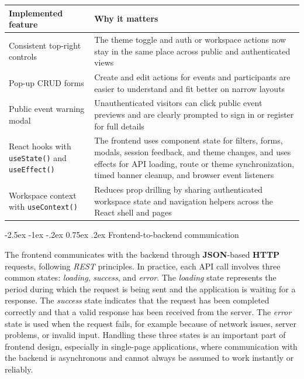 \documentclass[11pt,a4paper]{article}
\makeatletter
\renewcommand\subsection{\@startsection{subsection}{2}{\z@}%
  {-2.5ex \@plus -1ex \@minus -.2ex}%
  {0.75ex \@plus .2ex}%
  {\normalfont\large\sffamily\bfseries\color{MidnightBlue}}}
\makeatother
\begin{document}
\begin{center}
\begin{tabularx}{\textwidth}{@{}lY@{}}
\toprule
\textbf{Implemented feature} & \textbf{Why it matters} \\
\midrule
Consistent top-right controls & The theme toggle and auth or workspace actions now stay in the same place across public and authenticated views \\
Pop-up CRUD forms & Create and edit actions for events and participants are easier to understand and fit better on narrow layouts \\
Public event warning modal & Unauthenticated visitors can click public event previews and are clearly prompted to sign in or register for full details \\
React hooks with \texttt{useState()} and \texttt{useEffect()} & The frontend uses component state for filters, forms, modals, session feedback, and theme changes, and uses effects for API loading, route or theme synchronization, timed banner cleanup, and browser event listeners \\
Workspace context with \texttt{useContext()} & Reduces prop drilling by sharing authenticated workspace state and navigation helpers across the React shell and pages \\
\bottomrule
\end{tabularx}
\end{center}

\subsection{Frontend-to-backend communication}

The frontend communicates with the backend through \textbf{JSON}-based \textbf{HTTP} requests, following \textit{REST} principles. In practice, each API call involves three common states: \textit{loading}, \textit{success}, and \textit{error}. The \textit{loading} state represents the period during which the request is being sent and the application is waiting for a response. The \textit{success} state indicates that the request has been completed correctly and that a valid response has been received from the server. The \textit{error} state is used when the request fails, for example because of network issues, server problems, or invalid input. Handling these three states is an important part of frontend design, especially in single-page applications, where communication with the backend is asynchronous and cannot always be assumed to work instantly or reliably.
\end{document}
